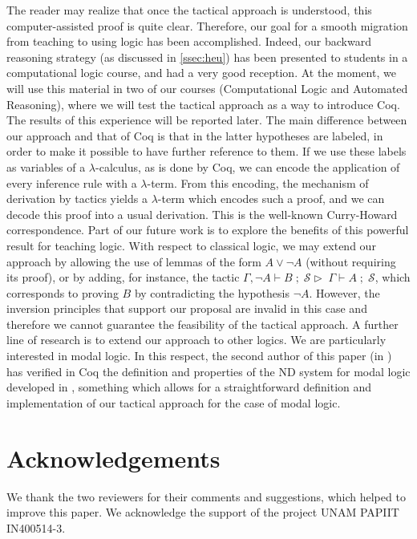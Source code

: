 \documentclass[a4paper,UKenglish]{lipics}
\newcommand{\G}{\Gamma}
\newcommand{\Sc}{\mathcal{S}}
\begin{document}
The reader may realize that once the tactical approach is understood, this computer-assisted proof is quite clear. Therefore, our goal for a smooth migration from teaching to using logic has been accomplished. Indeed, our backward reasoning strategy (as discussed in \ref{ssec:heu})
has been presented to students in a computational logic course, and had
a very good reception. At the moment, we will use this material in two of
our courses (Computational Logic and Automated Reasoning), where we will test the
tactical approach as a way to introduce {\sc Coq}. The results of
this experience will be reported later. 
The main difference between our approach and that of {\sc Coq} is that in the latter hypotheses are labeled, in order to make it possible to have further reference to them. If we use these labels as variables of a $\lambda$-calculus, as is done by {\sc Coq}, we can encode the application of every inference rule with a $\lambda$-term. From this encoding, the mechanism of derivation by tactics yields a $\lambda$-term which encodes such a proof, and we can decode this proof into a usual derivation. This is the well-known Curry-Howard correspondence. Part of our future work is to explore the benefits of this powerful result for teaching logic. With respect to classical logic, we may extend our approach by allowing the use of lemmas of the form $A\lor\neg A$ (without requiring its proof), or by adding, for instance, the tactic $\G,\neg A\vdash B\; ; \; \Sc \rhd \; \G\vdash A\; ; \; \Sc$, which corresponds to proving $B$ by contradicting the hypothesis $\neg A$. However, the inversion principles that 
support our proposal are invalid in this case and therefore we cannot guarantee the feasibility of the tactical approach. A further line of research is to extend our approach to other logics. We are particularly interested in modal logic. In this respect, the second author of this paper (in \cite{l15}) has verified in {\sc Coq} the definition and properties of the ND system for modal logic developed in \cite{pd}, something which allows for a straightforward definition and implementation of our tactical approach for the case of modal logic.


\section*{Acknowledgements}

We thank the two reviewers for their comments and suggestions, which helped to improve this paper. We 
acknowledge the support of the project UNAM PAPIIT IN400514-3.
\end{document}

